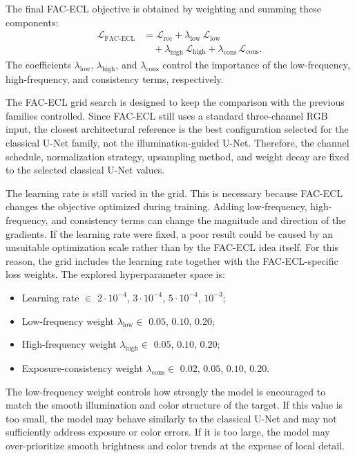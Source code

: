 The final FAC-ECL objective is obtained by weighting and summing these components:
\begin{equation}
	\begin{aligned}
		\mathcal{L}_{\mathrm{FAC\text{-}ECL}}
		&=
		\mathcal{L}_{\mathrm{rec}}
		+
		\lambda_{\mathrm{low}}\,\mathcal{L}_{\mathrm{low}} \\
		&\quad+
		\lambda_{\mathrm{high}}\,\mathcal{L}_{\mathrm{high}}
		+
		\lambda_{\mathrm{cons}}\,\mathcal{L}_{\mathrm{cons}}.
	\end{aligned}
	\label{eq:fac_ecl_loss}
\end{equation}
The coefficients $\lambda_{\mathrm{low}}$, $\lambda_{\mathrm{high}}$, and $\lambda_{\mathrm{cons}}$ control the importance of the low-frequency, high-frequency, and consistency terms, respectively.

The FAC-ECL grid search is designed to keep the comparison with the previous families controlled. Since FAC-ECL still uses a standard three-channel RGB input, the closest architectural reference is the best configuration selected for the classical U-Net family, not the illumination-guided U-Net. Therefore, the channel schedule, normalization strategy, upsampling method, and weight decay are fixed to the selected classical U-Net values.

The learning rate is still varied in the grid. This is necessary because FAC-ECL changes the objective optimized during training. Adding low-frequency, high-frequency, and consistency terms can change the magnitude and direction of the gradients. If the learning rate were fixed, a poor result could be caused by an unsuitable optimization scale rather than by the FAC-ECL idea itself. For this reason, the grid includes the learning rate together with the FAC-ECL-specific loss weights. The explored hyperparameter space is:

\begin{itemize}[topsep=5pt]
	\item Learning rate $\in$ $2{\cdot}10^{-4}$, $3{\cdot}10^{-4}$, $5{\cdot}10^{-4}$, $10^{-3}$;
	\item Low-frequency weight $\lambda_{\mathrm{low}} \in$ $0.05$, $0.10$, $0.20$;
	\item High-frequency weight $\lambda_{\mathrm{high}} \in$ $0.05$, $0.10$, $0.20$;
	\item Exposure-consistency weight $\lambda_{\mathrm{cons}} \in$ $0.02$, $0.05$, $0.10$, $0.20$.
\end{itemize}

The low-frequency weight controls how strongly the model is encouraged to match the smooth illumination and color structure of the target. If this value is too small, the model may behave similarly to the classical U-Net and may not sufficiently address exposure or color errors. If it is too large, the model may over-prioritize smooth brightness and color trends at the expense of local detail.

